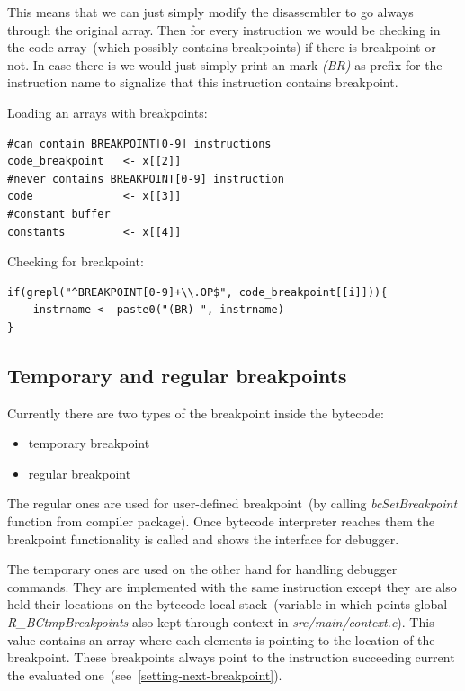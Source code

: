\documentclass[thesis=M,english]{FITthesis}[2018/10/20]
\begin{document}
This means that we can just simply modify the disassembler to go always through the original array. Then for every instruction we would be checking in the code array~(which possibly contains breakpoints) if there is breakpoint or not. In case there is we would just simply print an mark \textit{(BR)} as prefix for the instruction name to signalize that this instruction contains breakpoint.

Loading an arrays with breakpoints:
\begin{lstlisting}
#can contain BREAKPOINT[0-9] instructions
code_breakpoint   <- x[[2]]
#never contains BREAKPOINT[0-9] instruction
code              <- x[[3]]
#constant buffer
constants         <- x[[4]]
\end{lstlisting}


Checking for breakpoint:
\begin{lstlisting}
if(grepl("^BREAKPOINT[0-9]+\\.OP$", code_breakpoint[[i]])){
    instrname <- paste0("(BR) ", instrname)
}
\end{lstlisting}

\subsection{Temporary and regular breakpoints}

Currently there are two types of the breakpoint inside the bytecode:

\begin{itemize}
	\item temporary breakpoint
	\item regular breakpoint
\end{itemize}
	
The regular ones are used for user-defined breakpoint~(by calling \textit{bcSetBreakpoint} function from {compiler} package). Once bytecode interpreter reaches them the breakpoint functionality is called and shows the interface for debugger.

The temporary ones are used on the other hand for handling debugger commands. They are implemented with the same instruction except they are also held their locations on the bytecode local stack~(variable in which points global \textit{R{\_}BCtmpBreakpoints} also kept through context in \textit{src/main/context.c}). This value contains an array where each elements is pointing to the location of the breakpoint. These breakpoints always point to the instruction succeeding current the evaluated one~(see~\ref{setting-next-breakpoint}).
\end{document}
